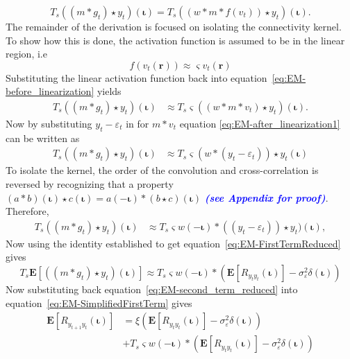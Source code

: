 \documentclass[]{article}
\newcommand{\parham}[1]{\textsf{\emph{\textbf{\textcolor{blue}{#1}}}}}
\begin{document}
\begin{equation}\label{eq:EM-before_linearization}
	T_s((m \ast g_t) \star y_t)(\boldsymbol\iota) = T_s((w \ast m\ast f(v_t)) \star y_t)(\boldsymbol\iota).
\end{equation}
The remainder of the derivation is focused on isolating the connectivity kernel. To show how this is done, the activation function is assumed to be in the linear region, i.e 
 \begin{equation}
	f\left(v_t(\mathbf{r})\right) \approx \varsigma v_t(\mathbf{r})
\end{equation} 
Substituting the linear activation function back into equation~\eqref{eq:EM-before_linearization} yields
\begin{align}\label{eq:EM-after_linearization1}	
	T_s((m \ast g_t) \star y_t)(\boldsymbol\iota) &\approx T_s\varsigma((w \ast m\ast v_t) \star y_t)(\boldsymbol\iota).
\end{align}
Now by substituting $y_t - \varepsilon_t$ in for $m\ast v_t$ equation \eqref{eq:EM-after_linearization1} can be written as 
\begin{align}
	T_s((m \ast g_t) \star y_t)(\boldsymbol\iota) &\approx T_s\varsigma(w\ast (y_t - \varepsilon_t)) \star y_t (\boldsymbol\iota)
\end{align}
To isolate the kernel, the order of the convolution and cross-correlation is reversed by recognizing that a property $(a \ast b)(\boldsymbol\iota) \star c(\boldsymbol\iota) = a(-\boldsymbol\iota)\ast(b \star c)(\boldsymbol\iota)$ \parham{(see Appendix for proof)}. Therefore,
\begin{align}
	T_s((m \ast g_t) \star y_t)(\boldsymbol\iota) &\approx T_s\varsigma w(-\boldsymbol\iota) \ast ((y_t - \varepsilon_t)) \star y_t)(\boldsymbol\iota),
\end{align}
Now using the identity established to get equation~\eqref{eq:EM-FirstTermReduced} gives
\begin{equation}\label{eq:EM-second_term_reduced}
	T_s\mathbf{E}\left[((m \ast g_t) \star y_t)(\boldsymbol\iota)\right] \approx T_s\varsigma w(-\boldsymbol\iota) \ast  (\mathbf{E}\left[R_{y_ty_t}(\boldsymbol\iota)\right] - \sigma_{\varepsilon}^2 \delta(\boldsymbol\iota))
\end{equation}
Now substituting back equation~\eqref{eq:EM-second_term_reduced} into equation~\eqref{eq:EM-SimplifiedFirstTerm} gives
\begin{align}\label{eq:EM-SimplifiedXcorr}
	\mathbf{E}[R_{y_{t+1}y_t}(\boldsymbol{\iota})] &= \xi\left(\mathbf{E}[ R_{y_ty_t}(\boldsymbol{\iota})] - \sigma_{\varepsilon}^2 \delta(\boldsymbol{\iota})\right)\nonumber \\
&+T_s\varsigma w(-\boldsymbol\iota) \ast  (\mathbf{E}\left[R_{y_ty_t}(\boldsymbol\iota)\right] - \sigma_{\varepsilon}^2 \delta(\boldsymbol\iota))
\end{align}
\end{document}
